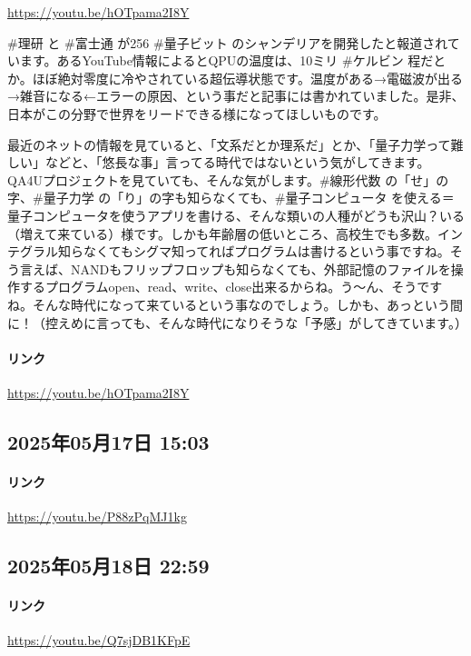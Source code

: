 \url{https://youtu.be/hOTpama2I8Y}

\#理研 と \#富士通 が256 \#量子ビット のシャンデリアを開発したと報道されています。あるYouTube情報によるとQPUの温度は、10ミリ \#ケルビン 程だとか。ほぼ絶対零度に冷やされている超伝導状態です。温度がある→電磁波が出る→雑音になる←エラーの原因、という事だと記事には書かれていました。是非、日本がこの分野で世界をリードできる様になってほしいものです。

最近のネットの情報を見ていると、「文系だとか理系だ」とか、「量子力学って難しい」などと、「悠長な事」言ってる時代ではないという気がしてきます。QA4Uプロジェクトを見ていても、そんな気がします。\#線形代数 の「せ」の字、\#量子力学 の「り」の字も知らなくても、\#量子コンピュータ を使える＝量子コンピュータを使うアプリを書ける、そんな類いの人種がどうも沢山？いる（増えて来ている）様です。しかも年齢層の低いところ、高校生でも多数。インテグラル知らなくてもシグマ知ってればプログラムは書けるという事ですね。そう言えば、NANDもフリップフロップも知らなくても、外部記憶のファイルを操作するプログラムopen、read、write、close出来るからね。う〜ん、そうですね。そんな時代になって来ているという事なのでしょう。しかも、あっという間に！（控えめに言っても、そんな時代になりそうな「予感」がしてきています。）

\paragraph{リンク}
\url{https://youtu.be/hOTpama2I8Y}

\subsection*{2025年05月17日 15:03}

\paragraph{リンク}
\url{https://youtu.be/P88zPqMJ1kg}

\subsection*{2025年05月18日 22:59}

\paragraph{リンク}
\url{https://youtu.be/Q7sjDB1KFpE}

